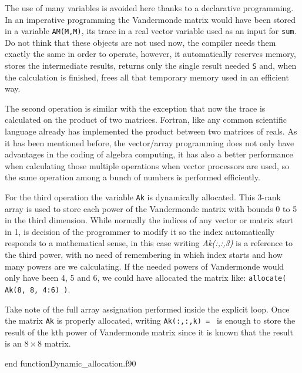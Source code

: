 The use of many variables is avoided here thanks to a declarative programming. In an imperative programming the Vandermonde matrix would have been stored in a variable \texttt{AM(M,M)}, its trace in a real vector variable used as an input for \texttt{sum}. Do not think that these objects are not used now, the compiler needs them exactly the same in order to operate, however, it automatically reserves memory, stores the intermediate results, returns only the single result needed \texttt{S} and, when the calculation is finished, frees all that temporary memory used in an efficient way. 

The second operation is similar with the exception that now the trace is calculated on the product of two matrices. Fortran, like any common scientific language already has implemented the product between two matrices of reals. As it has been mentioned before, the vector/array programming does not only have advantages in the coding of algebra computing, it has also a better performance when calculating those multiple operations when vector processors are used, so the same operation among a bunch of numbers is performed efficiently. 

For the third operation the variable \texttt{Ak} is dynamically allocated. This 3-rank array is used to store each power of the Vandermonde matrix with bounds 0 to 5 in the third dimension. While normally the indices of any vector or matrix start in 1, is decision of the programmer to modify it so the index automatically responds to a mathematical sense, in this case writing \textit{Ak(:,:,3)} is a reference to the third power, with no need of remembering in which index starts and how many powers are we calculating. If the needed powers of Vandermonde would only have been 4, 5 and 6, we could have allocated the matrix like: \texttt{allocate( Ak(8, 8, 4:6) )}. 

Take note of the full array assignation performed inside the explicit loop. Once the matrix \texttt{Ak} is properly allocated, writing \texttt{Ak(:,:,k) = } is enough to store the result of the kth power of Vandermonde matrix since it is known that the result is an $ 8\times 8 $ matrix. 



{end function}{Dynamic_allocation.f90}

